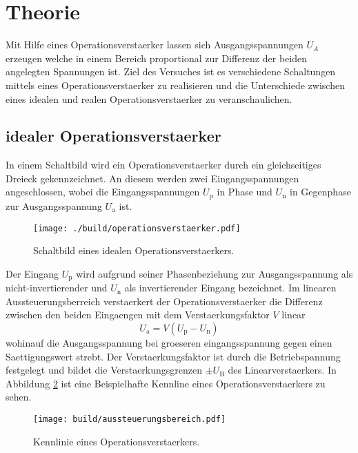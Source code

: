 \section{Theorie}\label{sec:theorie}
Mit Hilfe eines Operationsverstaerker lassen sich Ausgangsspannungen $U_A$
erzeugen welche in einem Bereich proportional zur Differenz der beiden
angelegten Spannungen ist. 
Ziel des Versuches ist es verschiedene Schaltungen mittels eines
Operationsverstaerker zu realisieren und die Unterschiede zwischen eines idealen
und realen Operationsverstaerker zu veranschaulichen.

\subsection{idealer Operationsverstaerker}%
\label{sub:idealer_operationsverstaerker}

In einem Schaltbild wird ein Operationsverstaerker durch ein gleichseitiges
Dreieck gekennzeichnet. 
An diesem werden zwei Eingangsspannungen angeschlossen, wobei die
Eingangsspannungen $U_\text{p}$ in Phase
und $U_\text{n}$ in Gegenphase zur Ausgangsspannung
$U_\text{a}$ ist.
\begin{figure}[h]
		\centering
		\texttt{[image: ./build/operationsverstaerker.pdf]}
		\caption{Schaltbild eines idealen Operationsverstaerkers.
		\cite{anleitung}}
		\label{fig:opv}
\end{figure}
Der Eingang $U_\text{p}$ wird aufgrund seiner Phasenbeziehung zur Ausgangsspannung
als nicht-invertierender und $U_\text{n}$ als invertierender Eingang bezeichnet. 
Im linearen Aussteuerungsberreich verstaerkert der Operationsverstaerker die
Differenz zwischen den beiden Eingaengen mit dem Verstaerkungsfaktor $V$ linear
\begin{equation}
		U_\text{a} = V \left( U_\text{p} - U_\text{n} \right)
\end{equation}
wohinauf die Ausgangsspannung bei groeseren eingangsspannung gegen einen
Saettigungswert strebt.
Der Verstaerkungsfaktor ist durch die Betriebspannung festgelegt
und bildet die Verstaerkungsgrenzen $\pm U_\text{B}$  des Linearverstaerkers.
In Abbildung \ref{fig:kennlinie} ist eine Beispielhafte Kennline eines
Operationsverstaerkers zu sehen. 
\begin{figure}[h]
		\centering
		\texttt{[image: build/aussteuerungsbereich.pdf]}
		\caption{Kennlinie eines Operationsverstaerkers. \cite{anleitung}}
		\label{fig:kennlinie}
\end{figure}

